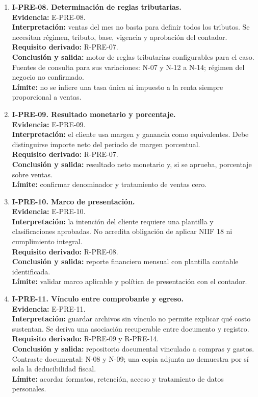 \begin{enumerate}
  \item \textbf{I-PRE-08. Determinación de reglas tributarias.}\\
  \textbf{Evidencia:} E-PRE-08.\\
  \textbf{Interpretación:} ventas del mes no basta para definir todos los
  tributos. Se necesitan régimen, tributo, base, vigencia y aprobación del
  contador.\\
  \textbf{Requisito derivado:} R-PRE-07.\\
  \textbf{Conclusión y salida:} motor de reglas tributarias configurables
  para el caso. Fuentes de consulta para sus variaciones: N-07 y N-12 a
  N-14; régimen del negocio no confirmado.\\
  \textbf{Límite:} no se infiere una tasa única ni impuesto a la renta
  siempre proporcional a ventas.

  \item \textbf{I-PRE-09. Resultado monetario y porcentaje.}\\
  \textbf{Evidencia:} E-PRE-09.\\
  \textbf{Interpretación:} el cliente usa margen y ganancia como
  equivalentes. Debe distinguirse importe neto del periodo de margen
  porcentual.\\
  \textbf{Requisito derivado:} R-PRE-07.\\
  \textbf{Conclusión y salida:} resultado neto monetario y, si se aprueba,
  porcentaje sobre ventas.\\
  \textbf{Límite:} confirmar denominador y tratamiento de ventas cero.

  \item \textbf{I-PRE-10. Marco de presentación.}\\
  \textbf{Evidencia:} E-PRE-10.\\
  \textbf{Interpretación:} la intención del cliente requiere una plantilla y
  clasificaciones aprobadas. No acredita obligación de aplicar NIIF 18 ni
  cumplimiento integral.\\
  \textbf{Requisito derivado:} R-PRE-08.\\
  \textbf{Conclusión y salida:} reporte financiero mensual con plantilla
  contable identificada.\\
  \textbf{Límite:} validar marco aplicable y política de presentación con el
  contador.

  \item \textbf{I-PRE-11. Vínculo entre comprobante y egreso.}\\
  \textbf{Evidencia:} E-PRE-11.\\
  \textbf{Interpretación:} guardar archivos sin vínculo no permite explicar
  qué costo sustentan. Se deriva una asociación recuperable entre documento
  y registro.\\
  \textbf{Requisito derivado:} R-PRE-09 y R-PRE-14.\\
  \textbf{Conclusión y salida:} repositorio documental vinculado a compras y
  gastos. Contraste documental: N-08 y N-09; una copia adjunta no demuestra
  por sí sola la deducibilidad fiscal.\\
  \textbf{Límite:} acordar formatos, retención, acceso y tratamiento de
  datos personales.


\end{enumerate}

